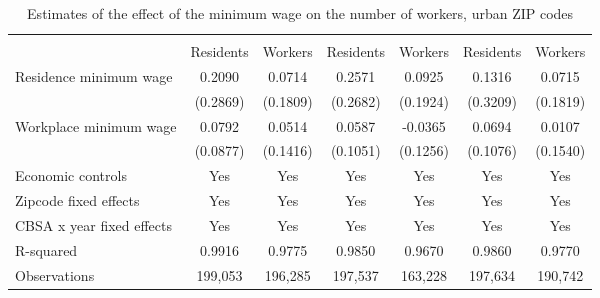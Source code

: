 \begin{table}[hbt!] \centering
    \caption{Estimates of the effect of the minimum wage on the number of workers, urban ZIP codes}
    \label{tab:total_migration}
    \begin{tabular}{lcccccc}
        \toprule 
         &  &  \\ \cmidrule(lr){2-3} \cmidrule(lr){4-5}
        & Residents & Workers & Residents & Workers & Residents & Workers \\  \midrule
        Residence minimum wage &  0.2090  &  0.0714  &  0.2571  &  0.0925  &  0.1316  &  0.0715  \\
                               & (0.2869) & (0.1809) & (0.2682) & (0.1924) & (0.3209) & (0.1819) \\
        Workplace minimum wage &  0.0792  &  0.0514  &  0.0587  &  -0.0365  &  0.0694  &  0.0107  \\
                               & (0.0877) & (0.1416) & (0.1051) & (0.1256) & (0.1076) & (0.1540) \\  \midrule
        Economic controls           &  Yes   &  Yes  &  Yes   &  Yes   &  Yes  &  Yes  \\
        Zipcode fixed effects       &  Yes   &  Yes  &  Yes   &  Yes   &  Yes  &  Yes  \\
        CBSA x year fixed effects   &  Yes   &  Yes  &  Yes   &  Yes   &  Yes  &  Yes  \\
        R-squared                   &  0.9916   &  0.9775  &  0.9850   &  0.9670   &  0.9860  &  0.9770  \\
        Observations                &  199,053  &  196,285 &  197,537  &  163,228  &  197,634 &  190,742  
        \\\bottomrule
    \end{tabular}
    

\end{table}
